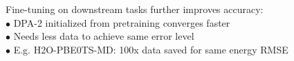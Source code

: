 \documentclass[preview]{standalone}
\begin{document}
\begin{center}
Fine-tuning on downstream tasks further improves accuracy: \\
            $\bullet$ DPA-2 initialized from pretraining converges faster \\
            $\bullet$ Needs less data to achieve same error level \\
            $\bullet$ E.g. H2O-PBE0TS-MD: 100x data saved for same energy RMSE
\end{center}
\end{document}
